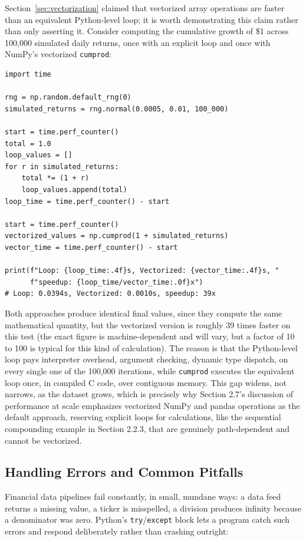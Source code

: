 \documentclass[../ai_in_finance]{subfiles}
\begin{document}
Section~\ref{sec:vectorization} claimed that vectorized array operations are faster than an equivalent Python-level loop; it is worth demonstrating this claim rather than only asserting it. Consider computing the cumulative growth of \$1 across 100,000 simulated daily returns, once with an explicit loop and once with NumPy's vectorized \texttt{cumprod}:

\begin{verbatim}
import time

rng = np.random.default_rng(0)
simulated_returns = rng.normal(0.0005, 0.01, 100_000)

start = time.perf_counter()
total = 1.0
loop_values = []
for r in simulated_returns:
    total *= (1 + r)
    loop_values.append(total)
loop_time = time.perf_counter() - start

start = time.perf_counter()
vectorized_values = np.cumprod(1 + simulated_returns)
vector_time = time.perf_counter() - start

print(f"Loop: {loop_time:.4f}s, Vectorized: {vector_time:.4f}s, "
      f"speedup: {loop_time/vector_time:.0f}x")
# Loop: 0.0394s, Vectorized: 0.0010s, speedup: 39x
\end{verbatim}

Both approaches produce identical final values, since they compute the same mathematical quantity, but the vectorized version is roughly 39 times faster on this test (the exact figure is machine-dependent and will vary, but a factor of 10 to 100 is typical for this kind of calculation).
The reason is that the Python-level loop pays interpreter overhead, argument checking, dynamic type dispatch, on every single one of the 100,000 iterations, while \texttt{cumprod} executes the equivalent loop once, in compiled C code, over contiguous memory. This gap widens, not narrows, as the dataset grows, which is precisely why Section 2.7's discussion of performance at scale emphasizes vectorized NumPy and pandas operations as the default approach, reserving explicit loops for calculations, like the sequential compounding example in Section 2.2.3, that are genuinely path-dependent and cannot be vectorized.

\subsection{Handling Errors and Common Pitfalls}

Financial data pipelines fail constantly, in small, mundane ways: a data feed returns a missing value, a ticker is misspelled, a division produces infinity because a denominator was zero. Python's \texttt{try}/\texttt{except} block lets a program catch such errors and respond deliberately rather than crashing outright:
\end{document}
